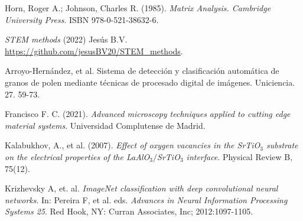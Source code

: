 \begin{thebibliography}{9}
Horn, Roger A.; Johnson, Charles R. (1985). \textit{Matrix Analysis. Cambridge University Press}. ISBN 978-0-521-38632-6.

\textit{STEM methods} (2022) Jesús B.V. \url{https://github.com/jesusBV20/STEM_methods}.

Arroyo-Hernández, et al. Sistema de detección y clasificación automática de granos de polen mediante técnicas de procesado digital de imágenes. Uniciencia. 27. 59-73. 

Francisco F. C. (2021). \textit{Advanced microscopy techniques applied to cutting edge material systems}. Universidad Complutense de Madrid.

Kalabukhov, A., et al. (2007). \textit{Effect of oxygen vacancies in the SrTiO$_3$ substrate on the electrical properties of the LaAlO$_3/$SrTiO$_3$ interface}. Physical Review B, 75(12).

Krizhevsky A, et. al. \textit{ImageNet classification
with deep convolutional neural networks}. In: Pereira F, et al. eds. \textit{Advances in Neural
Information Processing Systems 25}. Red Hook, NY: Curran
Associates, Inc; 2012:1097-1105.
\end{thebibliography}


